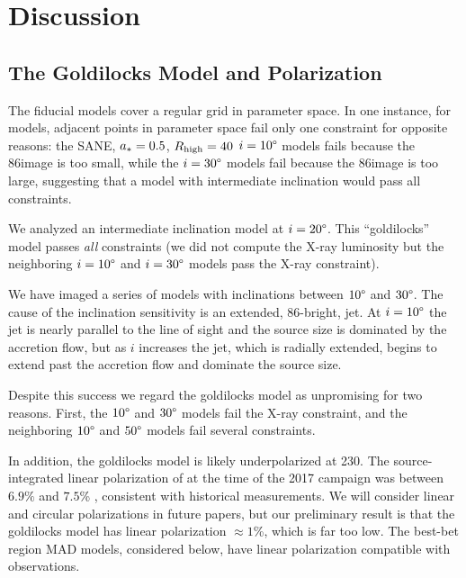 \section{Discussion}
\label{sec:discussions}

\subsection{The Goldilocks Model and Polarization}

The fiducial models cover a regular grid in parameter space.
In one instance, for \kharma models, adjacent points in parameter space fail only one constraint for opposite reasons: the SANE, $a_* = 0.5$, $R_\mathrm{high} = 40$ $i = 10\degree$ models fails because the 86\GHz image is too small, while the $i = 30\degree$ models fail because the 86\GHz image is too large, suggesting  that a model with intermediate inclination would pass all constraints.

We analyzed an intermediate inclination model at $i = 20\degree$.
This ``goldilocks'' model passes {\em all} constraints (we did not compute the X-ray luminosity but the neighboring $i=10\degree$ and $i=30\degree$ models pass the X-ray constraint).

We have imaged a series of \kharma models with inclinations between $10\degree$ and $30\degree$.
The cause of the inclination sensitivity is an extended, 86\GHz-bright, jet.
At $i = 10\degree$ the jet is nearly parallel to the line of sight and the source size is dominated by the accretion flow, but as $i$ increases the jet, which is radially extended, begins to extend past the accretion flow and dominate the source size.

Despite this success we regard the goldilocks model as unpromising for two reasons.
First, the $10\degree$ and $30\degree$ \bhac models fail the X-ray constraint, and the neighboring $10\degree$ and $50\degree$ \hamr models fail several constraints.

In addition, the goldilocks model is likely underpolarized at 230\GHz.
The source-integrated linear polarization of \sgra at the time of the 2017 campaign was between $6.9\%$ and $7.5$\% \citep{2021ApJ...910L..14G}, consistent with historical measurements.
We will consider linear and circular polarizations in future papers, but our preliminary result is that the goldilocks model has linear polarization $\approx 1$\%, which is far too low. The best-bet region MAD models, considered below, have linear polarization compatible with observations.

